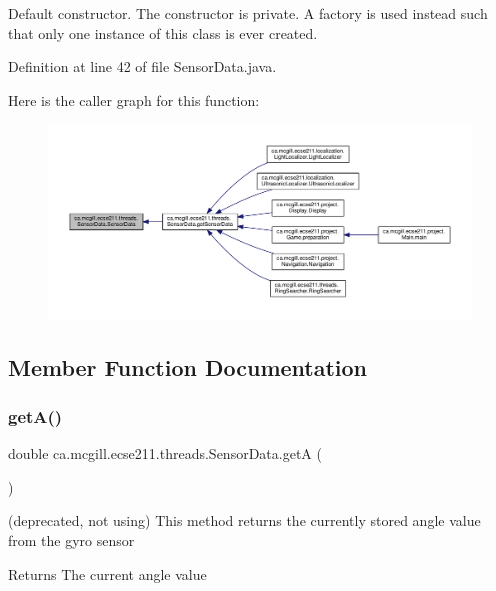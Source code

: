 Default constructor. The constructor is private. A factory is used instead such that only one instance of this class is ever created. 

Definition at line 42 of file Sensor\+Data.\+java.

Here is the caller graph for this function\+:
\nopagebreak
\begin{figure}[H]
\begin{center}
\leavevmode
\includegraphics[width=350pt]{classca_1_1mcgill_1_1ecse211_1_1threads_1_1_sensor_data_a11dcdc9c15184e05a9c84fc3958e26b6_icgraph}
\end{center}
\end{figure}


\subsection{Member Function Documentation}
\mbox{\label{classca_1_1mcgill_1_1ecse211_1_1threads_1_1_sensor_data_acc8f6cc56f39c8ea6b812cd8b135eca6}} 
\subsubsection{\texorpdfstring{get\+A()}{getA()}}
{\footnotesize\ttfamily double ca.\+mcgill.\+ecse211.\+threads.\+Sensor\+Data.\+getA (\begin{DoxyParamCaption}{ }\end{DoxyParamCaption})}

(deprecated, not using) This method returns the currently stored angle value from the gyro sensor

\begin{DoxyReturn}{Returns}
The current angle value 
\end{DoxyReturn}


